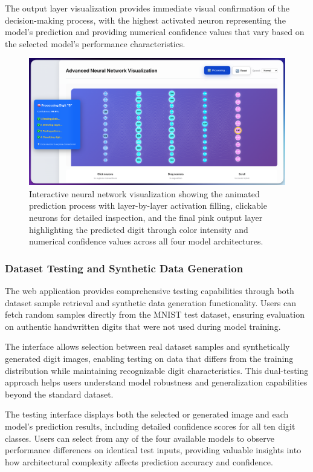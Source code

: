 \documentclass[11pt,a4paper]{report}
\begin{document}
The output layer visualization provides immediate visual confirmation of the decision-making process, with the highest activated neuron representing the model's prediction and providing numerical confidence values that vary based on the selected model's performance characteristics.

\begin{figure}[H]
\centering
\includegraphics[width=\textwidth]{digit_recognizer_neural_visualization_new.png}
\caption{Interactive neural network visualization showing the animated prediction process with layer-by-layer activation filling, clickable neurons for detailed inspection, and the final pink output layer highlighting the predicted digit through color intensity and numerical confidence values across all four model architectures.}
\label{fig:digit_neural_viz}
\end{figure}

\subsubsection{Dataset Testing and Synthetic Data Generation}

The web application provides comprehensive testing capabilities through both dataset sample retrieval and synthetic data generation functionality. Users can fetch random samples directly from the MNIST test dataset, ensuring evaluation on authentic handwritten digits that were not used during model training.

The interface allows selection between real dataset samples and synthetically generated digit images, enabling testing on data that differs from the training distribution while maintaining recognizable digit characteristics. This dual-testing approach helps users understand model robustness and generalization capabilities beyond the standard dataset.

The testing interface displays both the selected or generated image and each model's prediction results, including detailed confidence scores for all ten digit classes. Users can select from any of the four available models to observe performance differences on identical test inputs, providing valuable insights into how architectural complexity affects prediction accuracy and confidence.
\end{document}
